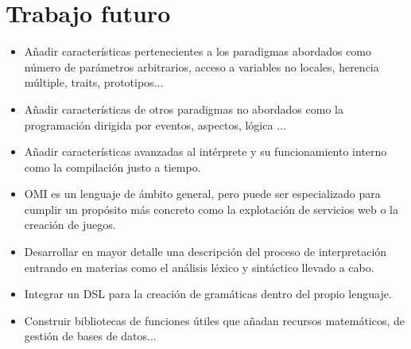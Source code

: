 \section{Trabajo futuro}
\begin{itemize}
\item Añadir características pertenecientes a los paradigmas abordados como número de parámetros arbitrarios, acceso a variables no locales, herencia múltiple, traits, prototipos...
\item Añadir características de otros paradigmas no abordados como la programación dirigida por eventos, aspectos, lógica ...
\item Añadir características avanzadas al intérprete y su funcionamiento interno como la compilación justo a tiempo.
\item OMI es un lenguaje de ámbito general, pero puede ser especializado para cumplir un propósito más concreto como la explotación de servicios web o la creación de juegos. 
\item Desarrollar en mayor detalle una descripción del proceso de interpretación entrando en materias como el análisis léxico y sintáctico llevado a cabo. 
\item Integrar un DSL para la creación de gramáticas dentro del propio lenguaje.
\item Construir bibliotecas de funciones útiles que añadan recursos matemáticos, de gestión de bases de datos...
\end{itemize}
